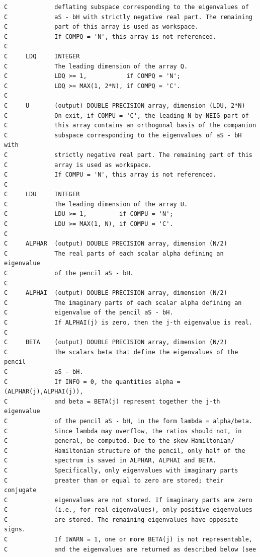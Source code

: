 \documentclass[a4paper,10pt]{article}
\begin{document}
\begin{verbatim}
C             deflating subspace corresponding to the eigenvalues of
C             aS - bH with strictly negative real part. The remaining
C             part of this array is used as workspace.
C             If COMPQ = 'N', this array is not referenced.
C
C     LDQ     INTEGER
C             The leading dimension of the array Q.
C             LDQ >= 1,           if COMPQ = 'N';
C             LDQ >= MAX(1, 2*N), if COMPQ = 'C'.
C
C     U       (output) DOUBLE PRECISION array, dimension (LDU, 2*N)
C             On exit, if COMPU = 'C', the leading N-by-NEIG part of
C             this array contains an orthogonal basis of the companion
C             subspace corresponding to the eigenvalues of aS - bH with
C             strictly negative real part. The remaining part of this
C             array is used as workspace.
C             If COMPU = 'N', this array is not referenced.
C
C     LDU     INTEGER
C             The leading dimension of the array U.
C             LDU >= 1,         if COMPU = 'N';
C             LDU >= MAX(1, N), if COMPU = 'C'.
C
C     ALPHAR  (output) DOUBLE PRECISION array, dimension (N/2)
C             The real parts of each scalar alpha defining an eigenvalue
C             of the pencil aS - bH.
C
C     ALPHAI  (output) DOUBLE PRECISION array, dimension (N/2)
C             The imaginary parts of each scalar alpha defining an
C             eigenvalue of the pencil aS - bH.
C             If ALPHAI(j) is zero, then the j-th eigenvalue is real.
C
C     BETA    (output) DOUBLE PRECISION array, dimension (N/2)
C             The scalars beta that define the eigenvalues of the pencil
C             aS - bH.
C             If INFO = 0, the quantities alpha = (ALPHAR(j),ALPHAI(j)),
C             and beta = BETA(j) represent together the j-th eigenvalue
C             of the pencil aS - bH, in the form lambda = alpha/beta.
C             Since lambda may overflow, the ratios should not, in
C             general, be computed. Due to the skew-Hamiltonian/
C             Hamiltonian structure of the pencil, only half of the
C             spectrum is saved in ALPHAR, ALPHAI and BETA.
C             Specifically, only eigenvalues with imaginary parts
C             greater than or equal to zero are stored; their conjugate
C             eigenvalues are not stored. If imaginary parts are zero
C             (i.e., for real eigenvalues), only positive eigenvalues
C             are stored. The remaining eigenvalues have opposite signs.
C             If IWARN = 1, one or more BETA(j) is not representable,
C             and the eigenvalues are returned as described below (see

\end{verbatim}
\end{document}
